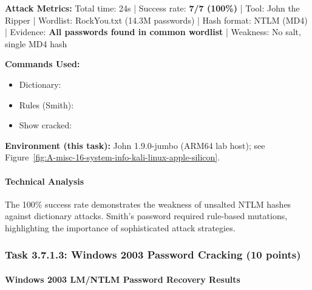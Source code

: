 \noindent\textbf{Attack Metrics:} Total time: 24s | Success rate: \textbf{7/7 (100\%)} | Tool: John the Ripper | Wordlist: RockYou.txt (14.3M passwords) | Hash format: NTLM (MD4) | Evidence: \textbf{All passwords found in common wordlist} | Weakness: No salt, single MD4 hash

\noindent\textbf{Commands Used:}
\begin{itemize}[nosep]
  \item Dictionary: 
  \item Rules (Smith): 
  \item Show cracked: 
\end{itemize}

\noindent\textbf{Environment (this task):} John 1.9.0-jumbo (ARM64 lab host); see Figure~\ref{fig:A-misc-16-system-info-kali-linux-apple-silicon}.


\paragraph{Technical Analysis}
The 100\% success rate demonstrates the weakness of unsalted NTLM hashes against dictionary attacks. Smith's password required rule-based mutations, highlighting the importance of sophisticated attack strategies.


\subsubsection{Task 3.7.1.3: Windows 2003 Password Cracking (10 points)}


\paragraph{Windows 2003 LM/NTLM Password Recovery Results}

